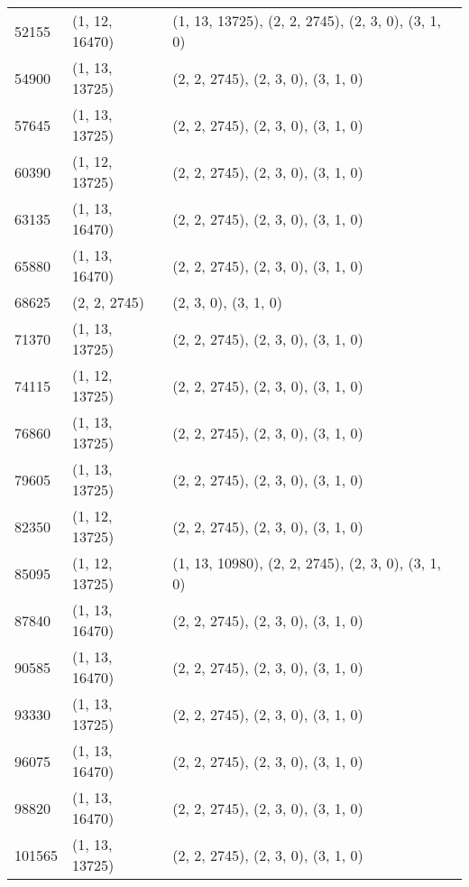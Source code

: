 \begin{center}
{\begin{tabularx}{\textwidth}{p{}|p{}|p{}}
			52155                  & (1, 12, 16470) & (1, 13, 13725), (2, 2, 2745), (2, 3, 0), (3, 1, 0)  \\
			54900                  & (1, 13, 13725) & (2, 2, 2745), (2, 3, 0), (3, 1, 0)                  \\
			57645                  & (1, 13, 13725) & (2, 2, 2745), (2, 3, 0), (3, 1, 0)                  \\
			60390                  & (1, 12, 13725) & (2, 2, 2745), (2, 3, 0), (3, 1, 0)                  \\
			63135                  & (1, 13, 16470) & (2, 2, 2745), (2, 3, 0), (3, 1, 0)                  \\
			65880                  & (1, 13, 16470) & (2, 2, 2745), (2, 3, 0), (3, 1, 0)                  \\
			68625                  & (2, 2, 2745)   & (2, 3, 0), (3, 1, 0)                                \\
			71370                  & (1, 13, 13725) & (2, 2, 2745), (2, 3, 0), (3, 1, 0)                  \\
			74115                  & (1, 12, 13725) & (2, 2, 2745), (2, 3, 0), (3, 1, 0)                  \\
			76860                  & (1, 13, 13725) & (2, 2, 2745), (2, 3, 0), (3, 1, 0)                  \\
			79605                  & (1, 13, 13725) & (2, 2, 2745), (2, 3, 0), (3, 1, 0)                  \\
			82350                  & (1, 12, 13725) & (2, 2, 2745), (2, 3, 0), (3, 1, 0)                  \\
			85095                  & (1, 12, 13725) & (1, 13, 10980), (2, 2, 2745), (2, 3, 0), (3, 1, 0)  \\
			87840                  & (1, 13, 16470) & (2, 2, 2745), (2, 3, 0), (3, 1, 0)                  \\
			90585                  & (1, 13, 16470) & (2, 2, 2745), (2, 3, 0), (3, 1, 0)                  \\
			93330                  & (1, 13, 13725) & (2, 2, 2745), (2, 3, 0), (3, 1, 0)                  \\
			96075                  & (1, 13, 16470) & (2, 2, 2745), (2, 3, 0), (3, 1, 0)                  \\
			98820                  & (1, 13, 16470) & (2, 2, 2745), (2, 3, 0), (3, 1, 0)                  \\
			101565                 & (1, 13, 13725) & (2, 2, 2745), (2, 3, 0), (3, 1, 0)                  \\

\end{tabularx}}
\end{center}
